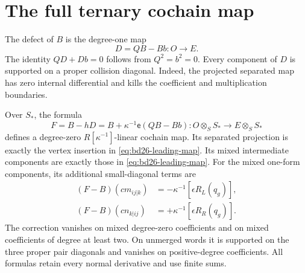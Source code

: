 \section{The full ternary cochain map}

The defect of $B$ is the degree-one map
\[
 D=QB-Bb:O\longrightarrow E.
\]
The identity $QD+Db=0$ follows from $Q^2=b^2=0$.
Every component of $D$ is supported on a proper collision diagonal.
Indeed, the projected separated map has zero internal differential and kills the coefficient and multiplication boundaries.

\begin{theorem}\label{thm:bd26-full-comparison}
Over $S_*$, the formula
\begin{equation}\label{eq:bd26-full-map}
 F=B-hD=B+\kappa^{-1}\mathsf e(QB-Bb)
 \colon O\otimes_S S_*\longrightarrow E\otimes_S S_*
\end{equation}
defines a degree-zero $R[\kappa^{-1}]$-linear cochain map.
Its separated projection is exactly the vertex insertion in \eqref{eq:bd26-leading-map}.
Its mixed intermediate components are exactly those in \eqref{eq:bd26-leading-map}.
For the mixed one-form components, its additional small-diagonal terms are
\begin{equation}\label{eq:bd26-mixed-correction}
 \begin{aligned}
 (F-B)(cm_{ij|k})&=-\kappa^{-1}[\epsilon R_L(q_g)],\\
 (F-B)(cn_{k|ij})&=+\kappa^{-1}[\epsilon R_R(q_g)].
 \end{aligned}
\end{equation}
The correction vanishes on mixed degree-zero coefficients and on mixed coefficients of degree at least two.
On unmerged words it is supported on the three proper pair diagonals and vanishes on positive-degree coefficients.
All formulas retain every normal derivative and use finite sums.
\end{theorem}
